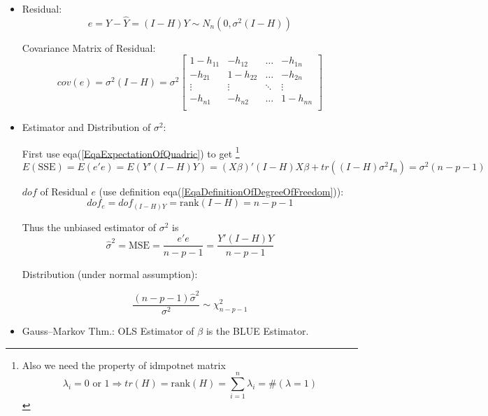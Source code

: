 \begin{itemize}[topsep=2pt,itemsep=2pt]
    \item Residual:
    \begin{equation}\label{EqaMatrixNotationOfResidual}
        e=Y-\hat{Y}=(I-H)Y\sim N_n\left(0 , \sigma ^2(I-H) \right)
    \end{equation}

    Covariance Matrix of Residual:
    \begin{equation}
        cov(e)=\sigma ^2(I-H)=
        \sigma ^2\begin{bmatrix}
        1-h_{11}&-h_{12}&\ldots&-h_{1n}\\
        -h_{21}&1-h_{22}&\ldots&-h_{2n}\\
        \vdots&\vdots&\ddots&\vdots\\
        -h_{n1}&-h_{n2}&\ldots&1-h_{nn}\\
        \end{bmatrix}
    \end{equation}
    
    
    \item Estimator and Distribution of  $ \sigma ^2 $:
    
    First use eqa(\ref{EqaExpectationOfQuadric}) to get \footnote{Also we need the property of idmpotnet matrix
    \begin{equation}
        \lambda_i=0\text{ or }1\Rightarrow tr(H)=\mathrm{rank}(H)=\sum_{i=1}^n\lambda _i=\# (\lambda =1) 
    \end{equation}
    }
    \begin{equation}\label{EqaExpectationOfSSE}
        E(\mathrm{SSE})=E(e'e)=E(Y'(I-H)Y)=(X\beta )'(I-H)X\beta +tr((I-H)\sigma ^2I_n) =\sigma ^2(n-p-1)
    \end{equation}

    $ dof $ of Residual $ e $ (use definition eqa(\ref{EqaDefinitionOfDegreeOfFreedom})):
    \begin{equation}
        dof_e=dof_{(I-H)Y}=\mathrm{rank}(I-H)=n-p-1 
    \end{equation}
    
    
    
    Thus the unbiased estimator of $ \sigma ^2 $ is 
    \begin{equation}
        \hat{\sigma }^2=\mathrm{MSE}=\dfrac{e'e}{n-p-1}=\dfrac{Y'(I-H)Y}{n-p-1}
    \end{equation}

    Distribution (under normal assumption):
    
    \begin{equation}\label{EqaDistributionOfMultiVariateSigma}
        \dfrac{(n-p-1)\hat{\sigma }^2}{\sigma ^2}\sim \chi^2_{n-p-1}
    \end{equation}
    
    \item Gauss–Markov Thm.: OLS Estimator of $ \beta  $ is the BLUE Estimator.
\end{itemize}

